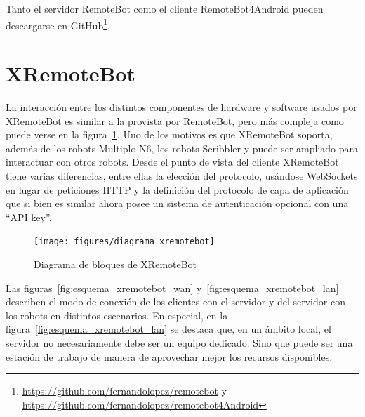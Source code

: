 Tanto el servidor RemoteBot como el cliente RemoteBot4Android pueden
descargarse en
GitHub\footnote{\url{https://github.com/fernandolopez/remotebot} y\\
\url{https://github.com/fernandolopez/remotebot4Android}}.

\section{XRemoteBot}\label{sec:xremotebot}

La interacción entre los distintos componentes de hardware y software usados
por XRemoteBot es similar a la provista por RemoteBot,
pero más compleja como puede verse
en la figura~\ref{fig:diagrama_xremotebot}. Uno de los motivos es que
XRemoteBot soporta, además de los robots Multiplo N6,
los robots Scribbler y puede ser
ampliado para interactuar con otros robots. Desde el punto de vista del cliente
XRemoteBot tiene varias diferencias, entre ellas la elección del protocolo,
usándose WebSockets en lugar de peticiones HTTP y la definición del protocolo
de capa de aplicación que si bien es similar ahora posee un sistema de
autenticación opcional con una ``API key''.

\begin{figure}
    \centering
    \texttt{[image: figures/diagrama\_xremotebot]}
    \caption{Diagrama de bloques de XRemoteBot}\label{fig:diagrama_xremotebot}
\end{figure}

Las
figuras~\ref{fig:esquema_xremotebot_wan} y~\ref{fig:esquema_xremotebot_lan}
describen el modo de conexión de los clientes con el servidor y del
servidor con los robots en distintos escenarios. En especial, en la
figura~\ref{fig:esquema_xremotebot_lan} se destaca que, en un ámbito
local, el servidor no necesariamente debe ser un equipo dedicado. Sino
que puede ser una estación de trabajo de manera de aprovechar mejor
los recursos disponibles.


